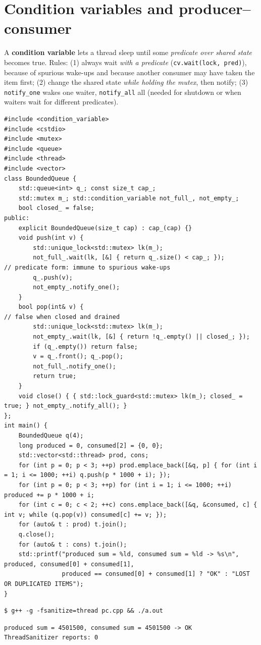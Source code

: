 \documentclass[10pt,a4paper,openany,oneside]{report}
\newcommand{\prio}[1]{\texorpdfstring{\ifcase#1\or{\color{gold}\ding{72}}\or{\color{gold}\ding{72}\ding{72}}\or{\color{gold}\ding{72}\ding{72}\ding{72}}\fi}{}}
\begin{document}
\section{Condition variables and producer--consumer \prio{2}}
A \textbf{condition variable} lets a thread sleep until some \emph{predicate over shared state} becomes true. Rules: (1) always wait \emph{with a predicate} (\texttt{cv.wait(lock, pred)}), because of spurious wake-ups and because another consumer may have taken the item first; (2) change the shared state \emph{while holding the mutex}, then notify; (3) \texttt{notify\_one} wakes one waiter, \texttt{notify\_all} all (needed for shutdown or when waiters wait for different predicates).
\begin{lstlisting}[language={[11]C++},basicstyle=\ttfamily\scriptsize,title={pc.cpp: bounded queue, 3 producers x 1000 items, 2 consumers}]
#include <condition_variable>
#include <cstdio>
#include <mutex>
#include <queue>
#include <thread>
#include <vector>
class BoundedQueue {
    std::queue<int> q_; const size_t cap_;
    std::mutex m_; std::condition_variable not_full_, not_empty_;
    bool closed_ = false;
public:
    explicit BoundedQueue(size_t cap) : cap_(cap) {}
    void push(int v) {
        std::unique_lock<std::mutex> lk(m_);
        not_full_.wait(lk, [&] { return q_.size() < cap_; });          // predicate form: immune to spurious wake-ups
        q_.push(v);
        not_empty_.notify_one();
    }
    bool pop(int& v) {                                                  // false when closed and drained
        std::unique_lock<std::mutex> lk(m_);
        not_empty_.wait(lk, [&] { return !q_.empty() || closed_; });
        if (q_.empty()) return false;
        v = q_.front(); q_.pop();
        not_full_.notify_one();
        return true;
    }
    void close() { { std::lock_guard<std::mutex> lk(m_); closed_ = true; } not_empty_.notify_all(); }
};
int main() {
    BoundedQueue q(4);
    long produced = 0, consumed[2] = {0, 0};
    std::vector<std::thread> prod, cons;
    for (int p = 0; p < 3; ++p) prod.emplace_back([&q, p] { for (int i = 1; i <= 1000; ++i) q.push(p * 1000 + i); });
    for (int p = 0; p < 3; ++p) for (int i = 1; i <= 1000; ++i) produced += p * 1000 + i;
    for (int c = 0; c < 2; ++c) cons.emplace_back([&q, &consumed, c] { int v; while (q.pop(v)) consumed[c] += v; });
    for (auto& t : prod) t.join();
    q.close();
    for (auto& t : cons) t.join();
    std::printf("produced sum = %ld, consumed sum = %ld -> %s\n", produced, consumed[0] + consumed[1],
                produced == consumed[0] + consumed[1] ? "OK" : "LOST OR DUPLICATED ITEMS");
}
\end{lstlisting}
\begin{lstlisting}[style=shcmd]
$ g++ -g -fsanitize=thread pc.cpp && ./a.out
\end{lstlisting}
\begin{lstlisting}[style=out]
produced sum = 4501500, consumed sum = 4501500 -> OK
ThreadSanitizer reports: 0
\end{lstlisting}
\end{document}

